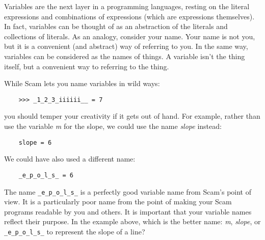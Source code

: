Variables are the next layer in a programming languages,
resting on
the literal expressions and combinations of expressions (which are
expressions themselves).
In fact,
variables can be thought of as an
abstraction of the literals and collections of literals.
As an analogy,
consider your name.
Your
name is not you,
but it is a convenient (and abstract) way of referring
to you.
In the same way,
variables can be considered as the names of
things.
A variable isn't the thing itself,
but a convenient way to referring
to the thing.

While Scam lets you name variables in wild ways:

\begin{verbatim}
    >>> _1_2_3_iiiiii__ = 7
\end{verbatim}

you should temper your
creativity if it gets out of hand.
For example,
rather than use the
variable {\it m} for the slope,
we could use the name {\it slope} instead:

\begin{verbatim}
    slope = 6
\end{verbatim}

We could have also used a different name:

\begin{verbatim}
    _e_p_o_l_s_ = 6
\end{verbatim}

The name {\tt \_e\_p\_o\_l\_s\_}
is a perfectly good variable name from Scam's point of
view.
It is a particularly poor name from the point of making your Scam
programs readable by you and others.
It is important that your variable
names reflect their purpose.
In the example above,
which is the better name: {\it m}, {\it slope}, or 
{\tt \_e\_p\_o\_l\_s\_}
to represent the slope of a line?
